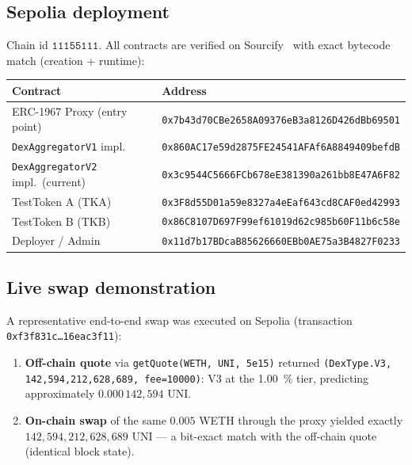 \documentclass[11pt,a4paper]{article}
\theoremstyle{definition}
\begin{document}
\subsection{Sepolia deployment}

Chain id $\mathtt{11155111}$. All contracts are verified on
Sourcify~\cite{sourcify} with exact bytecode match (creation + runtime):

\begin{center}
\small
\begin{tabular}{ll}
\toprule
\textbf{Contract} & \textbf{Address} \\
\midrule
ERC-1967 Proxy (entry point) & \texttt{0x7b43d70CBe2658A09376eB3a8126D426dBb69501} \\
\texttt{DexAggregatorV1} impl. & \texttt{0x860AC17e59d2875FE24541AFAf6A8849409befdB} \\
\texttt{DexAggregatorV2} impl.\ (current) & \texttt{0x3c9544C5666FCb678eE381390a261bb8E47A6F82} \\
TestToken A (TKA) & \texttt{0x3F8d55D01a59e8327a4eEaf643cd8CAF0ed42993} \\
TestToken B (TKB) & \texttt{0x86C8107D697F99ef61019d62c985b60F11b6c58e} \\
Deployer / Admin & \texttt{0x11d7b17BDcaB85626660EBb0AE75a3B4827F0233} \\
\bottomrule
\end{tabular}
\end{center}

\subsection{Live swap demonstration}

A representative end-to-end swap was executed on Sepolia (transaction
\texttt{0xf3f831c\ldots16eac3f11}):

\begin{enumerate}[leftmargin=*]
    \item \textbf{Off-chain quote} via \texttt{getQuote(WETH, UNI, 5e15)} returned
          \texttt{(DexType.V3, 142{,}594{,}212{,}628{,}689, fee=10000)}: V3 at the
          \SI{1.00}{\percent} tier, predicting approximately $0.000\,142{,}594$
          UNI.
    \item \textbf{On-chain swap} of the same $0.005$ WETH through the proxy yielded
          exactly $142{,}594{,}212{,}628{,}689$ UNI --- a bit-exact match with the
          off-chain quote (identical block state).
\end{enumerate}
\end{document}
